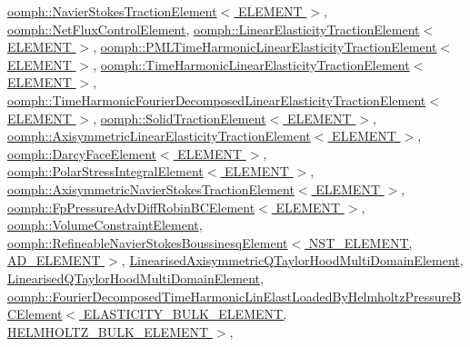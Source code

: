 \hyperlink{classoomph_1_1NavierStokesTractionElement_a87adb28c2292e58aab9ff1d1ebbd3fc7}{oomph\+::\+Navier\+Stokes\+Traction\+Element$<$ E\+L\+E\+M\+E\+N\+T $>$}, \hyperlink{classoomph_1_1NetFluxControlElement_a7b7d3a32fcad5b06fe6a49f05f2c01a9}{oomph\+::\+Net\+Flux\+Control\+Element}, \hyperlink{classoomph_1_1LinearElasticityTractionElement_a359bf39aba8f5e99b54f0bc0242409ca}{oomph\+::\+Linear\+Elasticity\+Traction\+Element$<$ E\+L\+E\+M\+E\+N\+T $>$}, \hyperlink{classoomph_1_1PMLTimeHarmonicLinearElasticityTractionElement_abde183ce1fbe5c0d8ce199978a972394}{oomph\+::\+P\+M\+L\+Time\+Harmonic\+Linear\+Elasticity\+Traction\+Element$<$ E\+L\+E\+M\+E\+N\+T $>$}, \hyperlink{classoomph_1_1TimeHarmonicLinearElasticityTractionElement_abe56c5d06398dd108308b8105cb24de9}{oomph\+::\+Time\+Harmonic\+Linear\+Elasticity\+Traction\+Element$<$ E\+L\+E\+M\+E\+N\+T $>$}, \hyperlink{classoomph_1_1TimeHarmonicFourierDecomposedLinearElasticityTractionElement_a4f179e4db7ec168346089fb1b75fbdc8}{oomph\+::\+Time\+Harmonic\+Fourier\+Decomposed\+Linear\+Elasticity\+Traction\+Element$<$ E\+L\+E\+M\+E\+N\+T $>$}, \hyperlink{classoomph_1_1SolidTractionElement_a7f6315287b8d863631a06b75e0cc7daf}{oomph\+::\+Solid\+Traction\+Element$<$ E\+L\+E\+M\+E\+N\+T $>$}, \hyperlink{classoomph_1_1AxisymmetricLinearElasticityTractionElement_a2a94d08c2f96f71ecd6edcfdfbceb4ab}{oomph\+::\+Axisymmetric\+Linear\+Elasticity\+Traction\+Element$<$ E\+L\+E\+M\+E\+N\+T $>$}, \hyperlink{classoomph_1_1DarcyFaceElement_a7b114cbc2c42545d84be0342801ae7c0}{oomph\+::\+Darcy\+Face\+Element$<$ E\+L\+E\+M\+E\+N\+T $>$}, \hyperlink{classoomph_1_1PolarStressIntegralElement_a6d69d508578b03a2f219e49089f5323c}{oomph\+::\+Polar\+Stress\+Integral\+Element$<$ E\+L\+E\+M\+E\+N\+T $>$}, \hyperlink{classoomph_1_1AxisymmetricNavierStokesTractionElement_ae271883f9813c9fd095cdd501ab7f4b1}{oomph\+::\+Axisymmetric\+Navier\+Stokes\+Traction\+Element$<$ E\+L\+E\+M\+E\+N\+T $>$}, \hyperlink{classoomph_1_1FpPressureAdvDiffRobinBCElement_aa9504d4561f8e4030d9a7a6bf4015ce7}{oomph\+::\+Fp\+Pressure\+Adv\+Diff\+Robin\+B\+C\+Element$<$ E\+L\+E\+M\+E\+N\+T $>$}, \hyperlink{classoomph_1_1VolumeConstraintElement_a725474b173e3887f5f7e025acf768b28}{oomph\+::\+Volume\+Constraint\+Element}, \hyperlink{classoomph_1_1RefineableNavierStokesBoussinesqElement_aab6bae7d0704ab7e3e121ee594ac887a}{oomph\+::\+Refineable\+Navier\+Stokes\+Boussinesq\+Element$<$ N\+S\+T\+\_\+\+E\+L\+E\+M\+E\+N\+T, A\+D\+\_\+\+E\+L\+E\+M\+E\+N\+T $>$}, \hyperlink{classLinearisedAxisymmetricQTaylorHoodMultiDomainElement_adc20fbe7a713cb4b1d80c750698416ed}{Linearised\+Axisymmetric\+Q\+Taylor\+Hood\+Multi\+Domain\+Element}, \hyperlink{classLinearisedQTaylorHoodMultiDomainElement_ae408b0f2829214b7b5d5be7f5d03a604}{Linearised\+Q\+Taylor\+Hood\+Multi\+Domain\+Element}, \hyperlink{classoomph_1_1FourierDecomposedTimeHarmonicLinElastLoadedByHelmholtzPressureBCElement_ac5f6369682a12573e07f07651ffb2a5f}{oomph\+::\+Fourier\+Decomposed\+Time\+Harmonic\+Lin\+Elast\+Loaded\+By\+Helmholtz\+Pressure\+B\+C\+Element$<$ E\+L\+A\+S\+T\+I\+C\+I\+T\+Y\+\_\+\+B\+U\+L\+K\+\_\+\+E\+L\+E\+M\+E\+N\+T, H\+E\+L\+M\+H\+O\+L\+T\+Z\+\_\+\+B\+U\+L\+K\+\_\+\+E\+L\+E\+M\+E\+N\+T $>$}, 